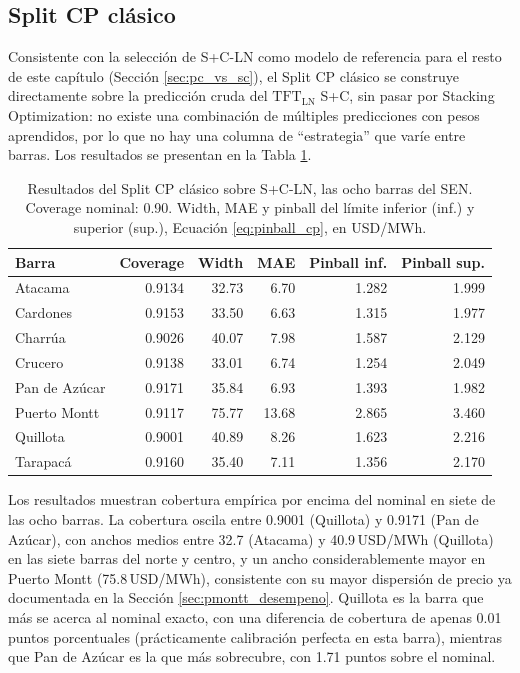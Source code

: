 \subsection{Split CP clásico}
\label{sec:split_cp_clasico}

Consistente con la selección de S+C-LN como modelo de referencia para el resto de este capítulo (Sección \ref{sec:pc_vs_sc}), el Split CP clásico se construye directamente sobre la predicción cruda del $\text{TFT}_\text{LN}$ S+C, sin pasar por Stacking Optimization: no existe una combinación de múltiples predicciones con pesos aprendidos, por lo que no hay una columna de ``estrategia'' que varíe entre barras. Los resultados se presentan en la Tabla \ref{tab:scp_resultados}.

\begin{table}[htbp]
    \centering
    \small
    \begin{tabular}{lrrrrr}
        \toprule
        Barra & Coverage & Width & MAE & Pinball inf. & Pinball sup. \\
        \midrule
        Atacama       & 0.9134 & 32.73 & 6.70  & 1.282 & 1.999 \\
        Cardones      & 0.9153 & 33.50 & 6.63  & 1.315 & 1.977 \\
        Charrúa       & 0.9026 & 40.07 & 7.98  & 1.587 & 2.129 \\
        Crucero       & 0.9138 & 33.01 & 6.74  & 1.254 & 2.049 \\
        Pan de Azúcar & 0.9171 & 35.84 & 6.93  & 1.393 & 1.982 \\
        Puerto Montt  & 0.9117 & 75.77 & 13.68 & 2.865 & 3.460 \\
        Quillota      & 0.9001 & 40.89 & 8.26  & 1.623 & 2.216 \\
        Tarapacá      & 0.9160 & 35.40 & 7.11  & 1.356 & 2.170 \\
        \bottomrule
    \end{tabular}
    \caption{Resultados del Split CP clásico sobre S+C-LN, las ocho barras del SEN. Coverage nominal: 0.90. Width, MAE y pinball del límite inferior (inf.) y superior (sup.), Ecuación \ref{eq:pinball_cp}, en USD/MWh.}
    \label{tab:scp_resultados}
\end{table}

Los resultados muestran cobertura empírica por encima del nominal en siete de las ocho barras. La cobertura oscila entre 0.9001 (Quillota) y 0.9171 (Pan de Azúcar), con anchos medios entre 32.7 (Atacama) y 40.9\,USD/MWh (Quillota) en las siete barras del norte y centro, y un ancho considerablemente mayor en Puerto Montt (75.8\,USD/MWh), consistente con su mayor dispersión de precio ya documentada en la Sección \ref{sec:pmontt_desempeno}. Quillota es la barra que más se acerca al nominal exacto, con una diferencia de cobertura de apenas 0.01 puntos porcentuales (prácticamente calibración perfecta en esta barra), mientras que Pan de Azúcar es la que más sobrecubre, con 1.71 puntos sobre el nominal.

